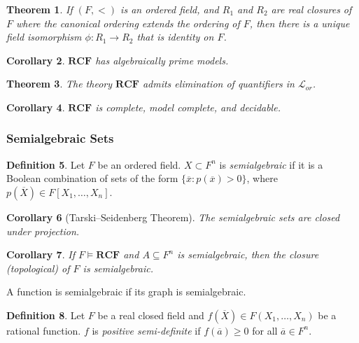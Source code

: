 \documentclass{amsart}
\newtheorem{theorem}{Theorem}[section]
\newtheorem{corollary}[theorem]{Corollary}
\theoremstyle{definition}
\newtheorem{definition}[theorem]{Definition}
\numberwithin{equation}{section}
\begin{document}
\begin{theorem}
    If $(F,<)$ is an ordered field,
    and $R_1$ and $R_2$ are real closures of $F$ where the canonical ordering extends the ordering of $F$,
    then there is a unique field isomorphism $\phi: R_1 \to R_2$ that is identity on $F$.
\end{theorem}

\begin{corollary}
    $\mathbf{RCF}$ has algebraically prime models.
\end{corollary}

\begin{theorem}
    The theory $\mathbf{RCF}$ admits elimination of quantifiers in $\mathcal{L}_{or}$.
\end{theorem}

\begin{corollary}
    $\mathbf{RCF}$ is complete, model complete, and decidable.
\end{corollary}

\subsubsection{Semialgebraic Sets}
\begin{definition}
    Let $F$ be an ordered field.
    $X \subset F^n$ is \emph{semialgebraic} if it is a Boolean combination of sets of the form $\{\overline{x}:p(\overline{x})>0\}$,
    where $p(\overline{X}) \in F[X_1,\dots,X_n]$.
\end{definition}

\begin{corollary}[Tarski--Seidenberg Theorem]
    The semialgebraic sets are closed under projection.
\end{corollary}

\begin{corollary}
    If $F \models \mathbf{RCF}$ and $A \subseteq F^n$ is semialgebraic,
    then the closure (topological) of $F$ is semialgebraic.
\end{corollary}

A function is semialgebraic if its graph is semialgebraic.

\begin{definition}
    Let $F$ be a real closed field and 
    $f(\overline{X}) \in F(X_1,\dots,X_n)$ be a rational function.
    $f$ is \emph{positive semi-definite} if $f(\overline{a}) \ge 0$ for all $\overline{a} \in F^n$.
\end{definition}
\end{document}
